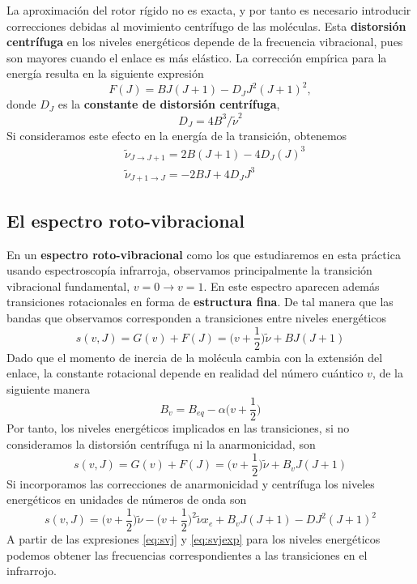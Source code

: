 \documentclass{tufte-book}
\begin{document}
La aproximación del rotor rígido no es exacta, y por tanto es necesario
introducir correcciones debidas al movimiento centrífugo de las moléculas.
Esta \textbf{distorsión centrífuga} en los niveles energéticos depende 
de la frecuencia vibracional, pues son mayores cuando el enlace es más 
elástico. La corrección empírica para la energía resulta en la siguiente
expresión
\begin{equation}
    F(J)=BJ(J+1) - D_JJ^2(J+1)^2,
\end{equation}
donde $D_J$ es la \textbf{constante de distorsión centrífuga}, 
\begin{equation}
    D_J=4B^3/\tilde{\nu}^2\label{eq:centrif}    
\end{equation}
Si consideramos este efecto en la energía de la transición, obtenemos
\begin{align}
    &\tilde{\nu}_{J\rightarrow J+1} = 2B(J+1) - 4D_J(J)^3\\
    &\tilde{\nu}_{J+1\rightarrow J} = -2BJ + 4D_JJ^3
\end{align}

\subsection{El espectro roto-vibracional}
En un \textbf{espectro roto-vibracional} como los que estudiaremos 
en esta práctica usando espectroscopía infrarroja, observamos 
principalmente la transición vibracional fundamental, 
$v=0\rightarrow v=1$. En este espectro aparecen además 
transiciones rotacionales en forma de \textbf{estructura fina}. 
De tal manera que las bandas que observamos corresponden
a transiciones entre niveles energéticos 
\begin{equation}
    s(v, J) = G(v) + F(J) = \Big(v+\frac{1}{2}\Big)\tilde{\nu} + BJ(J+1)
\end{equation}
Dado que el momento de inercia de la molécula cambia con la extensión
del enlace, la constante rotacional depende en realidad del número
cuántico $v$, de la siguiente manera
\begin{equation}
B_v = B_{eq} - \alpha\bigg(v+\frac{1}{2}\bigg)
\end{equation}
Por tanto, los niveles energéticos implicados en las transiciones, si no 
consideramos la distorsión centrífuga ni la anarmonicidad, son
\begin{equation}
    s(v, J) = G(v) + F(J) = \Big(v+\frac{1}{2}\Big)\tilde{\nu} + B_vJ(J+1)
    \label{eq:svj}
\end{equation}
Si incorporamos las correcciones de anarmonicidad y centrífuga
los niveles energéticos en unidades de números de onda son
\begin{equation}
    s(v, J) = \Big(v+\frac{1}{2}\Big)\tilde{\nu} - \Big(v+\frac{1}{2}\Big)^2\tilde{\nu}x_e + B_vJ(J+1)-DJ^2(J+1)^2
\label{eq:svjexp}
\end{equation}
A partir de las expresiones \ref{eq:svj} y \ref{eq:svjexp} para 
los niveles energéticos podemos obtener las frecuencias correspondientes
a las transiciones en el infrarrojo. 
\end{document}
